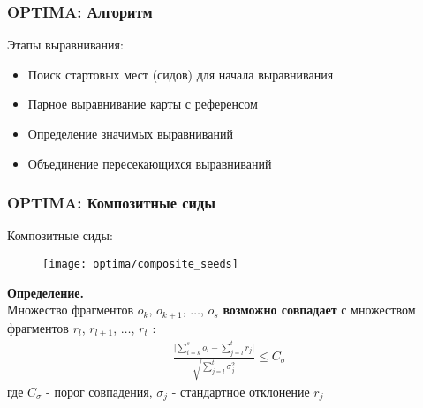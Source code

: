


\begin{frame}
\frametitle{OPTIMA: Алгоритм}

Этапы выравнивания:
\begin{itemize}
  \item Поиск стартовых мест (сидов) для начала выравнивания
  \item Парное выравнивание карты с референсом
  \item Определение значимых выравниваний
  \item Объединение пересекающихся выравниваний
\end{itemize}

\end{frame}

\begin{frame}
\frametitle{OPTIMA: Композитные сиды}
Композитные сиды:
\begin{figure}
  \centering
  \texttt{[image: optima/composite\_seeds]}
\end{figure}
\textbf{Определение.} \\
Множество фрагментов $o_k$, $o_{k + 1}$, $ \dots$, $o_{s}$ \textbf{возможно
совпадает} с множеством фрагментов $r_l$, $r_{l+1}$, $\dots$, $r_{t}$ :
\begin{gather}
\frac{\bigg|\sum\limits_{i = k}^s o_i - \sum\limits_{j = l}^t r_j \bigg|}{\sqrt{\sum\limits_{j = l}^t \sigma_j^2}} \le C_{\sigma}
\label{eq:feasible_match}
\end{gather}
где $C_{\sigma}$ - порог совпадения, $\sigma_j$ - стандартное отклонение $r_j$

\end{frame}

